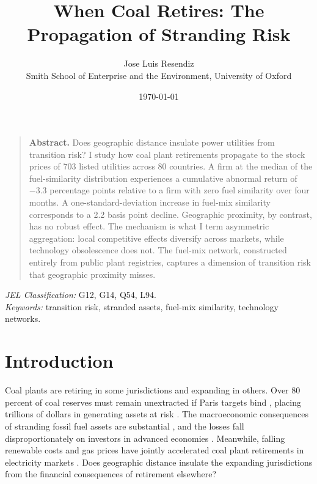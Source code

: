 \documentclass[12pt,a4paper]{article}
\title{\large\textbf{When Coal Retires: The Propagation of Stranding Risk}\vspace{-0.5em}}
\author{\normalsize Jose Luis Resendiz\\[4pt] \small Smith School of Enterprise and the Environment, University of Oxford}
\date{\small\today}
\begin{document}
{\singlespacing\maketitle}

\begin{quotation}\small\singlespacing\noindent
\textbf{Abstract.} Does geographic distance insulate power utilities from transition risk? I study how coal plant retirements propagate to the stock prices of 703 listed utilities across 80 countries. A firm at the median of the fuel-similarity distribution experiences a cumulative abnormal return of $-3.3$ percentage points relative to a firm with zero fuel similarity over four months. A one-standard-deviation increase in fuel-mix similarity corresponds to a 2.2 basis point decline. Geographic proximity, by contrast, has no robust effect. The mechanism is what I term asymmetric aggregation: local competitive effects diversify across markets, while technology obsolescence does not. The fuel-mix network, constructed entirely from public plant registries, captures a dimension of transition risk that geographic proximity misses.
\end{quotation}

\medskip\noindent\textit{JEL Classification:} G12, G14, Q54, L94.\\
\noindent\textit{Keywords:} transition risk, stranded assets, fuel-mix similarity, technology networks.

\section{Introduction}\label{sec:intro}

Coal plants are retiring in some jurisdictions and expanding in others. Over 80 percent of coal reserves must remain unextracted if Paris targets bind \citep{McGlade2015}, placing trillions of dollars in generating assets at risk \citep{Dietz2016}. The macroeconomic consequences of stranding fossil fuel assets are substantial \citep{MercurePollittVinualesEdwards2018}, and the losses fall disproportionately on investors in advanced economies \citep{SemieniukHoldenMercureSalas2022}. Meanwhile, falling renewable costs and gas prices have jointly accelerated coal plant retirements in electricity markets \citep{FellKaffine2018}. Does geographic distance insulate the expanding jurisdictions from the financial consequences of retirement elsewhere?
\end{document}
